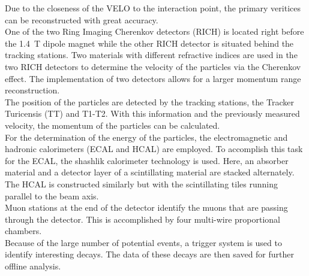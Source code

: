 Due to the closeness of the VELO to the 
interaction point, the primary veritices can be reconstructed with great accuracy. \\
One of the two Ring Imaging Cherenkov detectors (RICH) is located right before the \qty{1.4}{\tesla} dipole magnet while the other RICH detector is situated behind the tracking stations. Two materials with 
different refractive indices are used in the two RICH detectors to determine the velocity of the particles via the Cherenkov effect. The implementation of two detectors allows for a larger momentum range 
reconstruction. \\
The position of the particles are detected by the tracking stations, the Tracker Turicensis (TT) and T1-T2. With this information and the previously measured velocity, the momentum of the particles can
be calculated. \\
For the determination of the energy of the particles, the electromagnetic and hadronic calorimeters (ECAL and HCAL) are employed. To accomplish this task for the ECAL, the shashlik calorimeter 
technology is used. Here, an absorber material and a detector layer of a scintillating material are stacked alternately. The HCAL is constructed similarly but with the scintillating tiles running 
parallel to the beam axis. \\
Muon stations at the end of the detector identify the muons that are passing through the detector. This is accomplished by four multi-wire proportional chambers. \\
Because of the large number of potential events, a trigger system is used to identify interesting decays. The data of these decays are then saved for further offline analysis.

